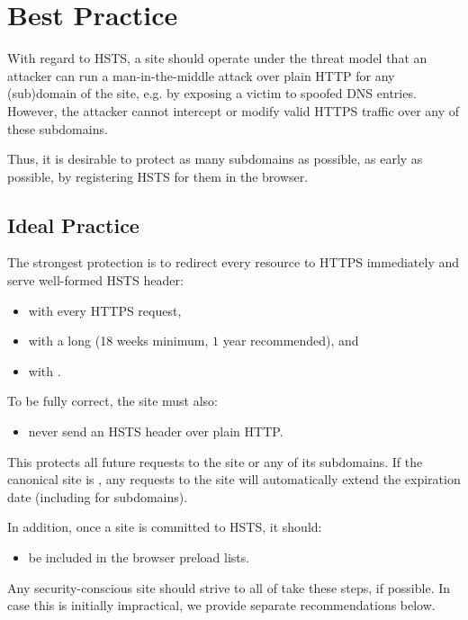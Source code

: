 \documentclass{acm_proc_article-sp}
\begin{document}
{\section{Best Practice}

With regard to HSTS, a site should operate under the threat model that an attacker can run a man-in-the-middle attack over plain HTTP for any (sub)domain of the site, e.g. by exposing a victim to spoofed DNS entries. However, the attacker cannot intercept or modify valid HTTPS traffic over any of these subdomains.

Thus, it is desirable to protect as many subdomains as possible, as early as possible, by registering HSTS for them in the browser.

\subsection{Ideal Practice}


The strongest protection is to redirect every resource to HTTPS immediately and serve well-formed  HSTS header:

\begin{itemize}
\item with every HTTPS request,
\item with a long  (18 weeks minimum, $1$ year recommended), and
\item with {\iSD}.
\end{itemize}

To be fully correct, the site must also:

\begin{itemize}
\item never send an HSTS header over plain HTTP.
\end{itemize}

This protects all future requests to the site or any of its subdomains. If the canonical site is {\s}, any requests to the site will automatically extend the expiration date (including for subdomains).

In addition, once a site is committed to HSTS, it should:
\begin{itemize}
\item be included in the browser preload lists.
\end{itemize}

Any security-conscious site should strive to all of take these steps, if possible. In case this is initially impractical, we provide separate recommendations below.

}
\end{document}
